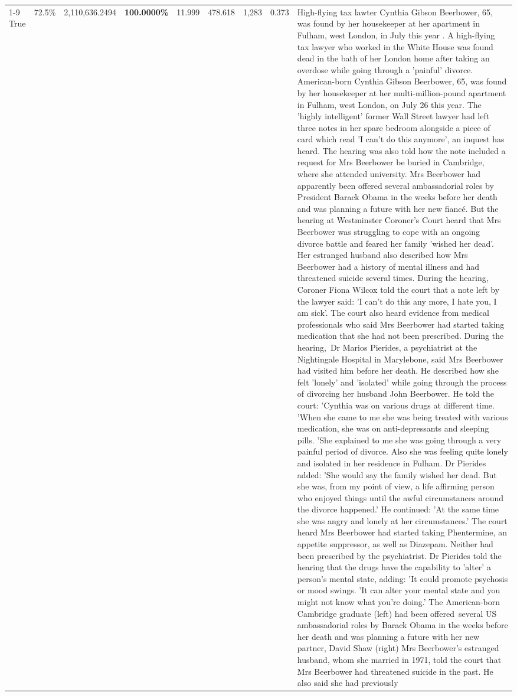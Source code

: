 \begin{table}[H]
\begin{tabular}{lllrlllll}
\cline{1-9}
True & 72.5\% & 2,110,636.2494 & \bfseries \color{red} 100.0000\% & 11.999 & 478.618 & 1,283 & 0.373 & High-flying tax lawter Cynthia Gibson Beerbower, 65, was found by her housekeeper at her apartment in Fulham, west London, in July this year . A high-flying tax lawyer who worked in the White House was found dead in the bath of her London home after taking an overdose while going through a 'painful' divorce. American-born Cynthia Gibson Beerbower, 65, was found by her housekeeper at her multi-million-pound apartment in Fulham, west London, on July 26 this year. The 'highly intelligent' former Wall Street lawyer had left three notes in her spare bedroom alongside a piece of card which read 'I can't do this anymore', an inquest has heard. The hearing was also told how the note included a request for Mrs Beerbower be buried in Cambridge, where she attended university. Mrs Beerbower had apparently been offered several ambassadorial roles by President Barack Obama in the weeks before her death and was planning a future with her new fiancé. But the hearing at Westminster Coroner's Court heard that Mrs Beerbower was struggling to cope with an ongoing divorce battle and feared her family 'wished her dead'. Her estranged husband also described how Mrs Beerbower had a history of mental illness and had threatened suicide several times. During the hearing, Coroner Fiona Wilcox told the court that a note left by the lawyer said: 'I can't do this any more, I hate you, I am sick'. The court also heard evidence from medical professionals who said Mrs Beerbower had started taking medication that she had not been prescribed. During the hearing, Dr Marios Pierides, a psychiatrist at the Nightingale Hospital in Marylebone, said Mrs Beerbower had visited him before her death. He described how she felt 'lonely' and 'isolated' while going through the process of divorcing her husband John Beerbower. He told the court: 'Cynthia was on various drugs at different time. 'When she came to me she was being treated with various medication, she was on anti-depressants and sleeping pills. 'She explained to me she was going through a very painful period of divorce. Also she was feeling quite lonely and isolated in her residence in Fulham. Dr Pierides added: 'She would say the family wished her dead. But she was, from my point of view, a life affirming person who enjoyed things until the awful circumstances around the divorce happened.' He continued: 'At the same time she was angry and lonely at her circumstances.' The court heard Mrs Beerbower had started taking Phentermine, an appetite suppressor, as well as Diazepam. Neither had been prescribed by the psychiatrist. Dr Pierides told the hearing that the drugs have the capability to 'alter' a person's mental state, adding: 'It could promote psychosis or mood swings. 'It can alter your mental state and you might not know what you're doing.' The American-born Cambridge graduate (left) had been offered several US ambassadorial roles by Barack Obama in the weeks before her death and was planning a future with her new partner, David Shaw (right) Mrs Beerbower's estranged husband, whom she married in 1971, told the court that Mrs Beerbower had threatened suicide in the past. He also said she had previously 
\end{tabular}
\end{table}
